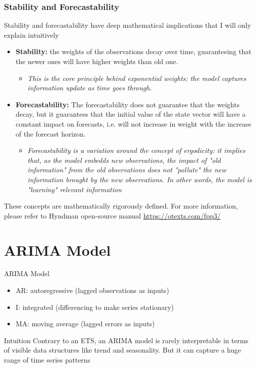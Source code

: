 \documentclass{beamer}
\newenvironment{wideitemize}{\itemize\addtolength{\itemsep}{10pt}}{\enditemize}
\begin{document}
\begin{frame}
  \frametitle{Stability and Forecastability}
  \begin{wideitemize}
  \item Stability and forecastability have deep mathematical implications that I will only explain intuitively
    \begin{itemize}
    \item \textbf{Stability:} the weights of the observations decay over time, guaranteeing that the newer ones will have higher weights than old one.
      \begin{itemize}
      \item \emph{This is the core principle behind exponential weights: the model captures information update as time goes through}. 
      \end{itemize}      
    \item \textbf{Forecastability:} The forecastability does not guarantee that the weights decay, but it guarantees that the initial value of the state vector will have a constant impact on forecasts, i.e. will not increase in weight with the increase of the forecast horizon.
      \begin{itemize}
      \item \emph{Forecastability is a variation around the concept of ergodicity: it implies that, as the model embedds new observations, the impact of "old information" from the old observations does not "pollute" the new information brought by the new observations. In other words, the model is "learning" relevant information }
      \end{itemize}
    \end{itemize}
    \item These concepts are mathematically rigorously defined. For more information, please refer to Hyndman open-source manual \url{https://otexts.com/fpp3/}
  \end{wideitemize}
\end{frame}


\section{ARIMA Model}


\begin{frame}{ARIMA Model}

  \begin{itemize}
  \item AR: autoregressive (lagged observations as inputs)
  \item I: integrated (differencing to make series stationary)
  \item MA: moving average (lagged errors as inputs)
  \end{itemize}

  \begin{block}{Intuition}
    Contrary to an ETS, an ARIMA model is rarely interpretable in terms of visible data structures like trend and seasonality. But it can capture a huge range of time series patterns
  \end{block}  
\end{frame}
\end{document}
